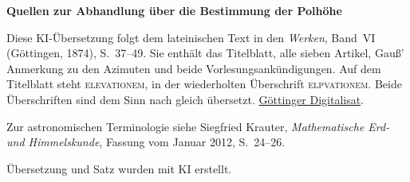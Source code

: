 \clearpage\thispagestyle{empty}
\begin{center}\textbf{Quellen zur Abhandlung über die Bestimmung der Polhöhe}\end{center}
\noindent Diese KI-Übersetzung folgt dem lateinischen Text in den \textit{Werken}, Band~VI (Göttingen, 1874), S.~37--49. Sie enthält das Titelblatt, alle sieben Artikel, Gauß’ Anmerkung zu den Azimuten und beide Vorlesungsankündigungen. Auf dem Titelblatt steht \mbox{\textsc{elevationem}}, in der wiederholten Überschrift \mbox{\textsc{elpvationem}}. Beide Überschriften sind dem Sinn nach gleich übersetzt. \href{https://gdz.sub.uni-goettingen.de/id/PPN236007467}{Göttinger Digitalisat}.
\par\smallskip\noindent Zur astronomischen Terminologie siehe Siegfried Krauter, \textit{Mathematische Erd- und Himmelskunde}, Fassung vom Januar 2012, S.~24--26.
\par\smallskip\noindent Übersetzung und Satz wurden mit KI erstellt.
\clearpage
